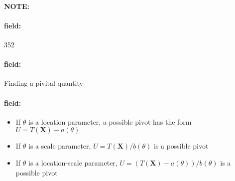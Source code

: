 \documentclass[12pt]{article}
\newenvironment{note}{\paragraph{NOTE:}}{}
\newenvironment{field}{\paragraph{field:}}{}
\begin{document}
\begin{note}
    \begin{field}
        \tiny 352
    \end{field}
    \begin{field}
        Finding a pivital quantity
    \end{field}
    \begin{field}
        \begin{itemize}
          \item If $\theta$ is a location parameter, a possible pivot has the form $U = T(\mathbf{X}) - a (\theta)$
          \item If $\theta$ is a scale parameter, $U = T(\mathbf{X})/b(\theta)$ is a possible pivot
          \item If $\theta$ is a location-scale parameter, $U = (T(\mathbf{X}) - a(\theta))/b(\theta)$ is a possible pivot
        \end{itemize}
    \end{field}
\end{note}
\end{document}
